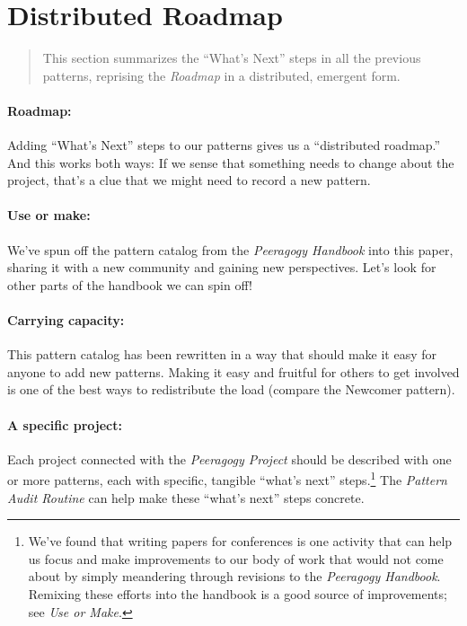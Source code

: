 \section{Distributed Roadmap}

\begin{quote}
This section summarizes the ``What's Next'' steps in all the previous
patterns, reprising the \emph{Roadmap} in a distributed, emergent form.
\end{quote}

\paragraph{Roadmap:} Adding ``What's Next'' steps to our patterns gives us a ``distributed roadmap.''  And this works both ways:  
If we sense that something needs to change about the project, that's a
clue that we might need to record a new pattern.

\paragraph{Use or make:} 
We've spun off the pattern catalog from the \emph{Peeragogy Handbook} into this paper, sharing it with a new community and gaining new perspectives.  Let's look for other parts of the handbook we can spin off!

\paragraph{Carrying capacity:} This pattern catalog has been rewritten in a way that should make it
easy for anyone to add new patterns. Making it easy and fruitful for
others to get involved is one of the best ways to redistribute the load
(compare the Newcomer pattern).

\paragraph{A specific project:} 
 Each project connected with the \emph{Peeragogy Project} should be described with one or more patterns, each with specific, tangible ``what's next'' steps.\footnote{We've found that writing papers for conferences is one activity that can help us focus and make improvements to our body of work that would not come about by simply meandering through revisions to the \emph{Peeragogy Handbook}.  Remixing these efforts into the handbook is a good source of improvements; see \emph{Use or Make}.}  The \emph{Pattern Audit Routine} can help make these ``what's next'' steps concrete.

